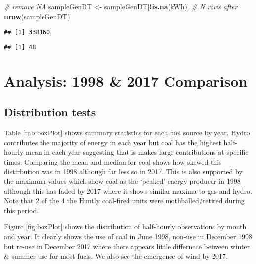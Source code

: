 \documentclass[]{article}
\newenvironment{Shaded}{\begin{snugshade}}{\end{snugshade}}
\newcommand{\KeywordTok}[1]{\textcolor[rgb]{0.13,0.29,0.53}{\textbf{#1}}}
\newcommand{\StringTok}[1]{\textcolor[rgb]{0.31,0.60,0.02}{#1}}
\newcommand{\CommentTok}[1]{\textcolor[rgb]{0.56,0.35,0.01}{\textit{#1}}}
\newcommand{\OperatorTok}[1]{\textcolor[rgb]{0.81,0.36,0.00}{\textbf{#1}}}
\newcommand{\NormalTok}[1]{#1}
\theoremstyle{definition}
\theoremstyle{definition}
\theoremstyle{definition}
\theoremstyle{remark}
\begin{document}
\begin{Shaded}
\begin{Highlighting}[]
\CommentTok{# remove NA}
\NormalTok{sampleGenDT <-}\StringTok{ }\NormalTok{sampleGenDT[}\OperatorTok{!}\KeywordTok{is.na}\NormalTok{(kWh)]}
\CommentTok{# N rows after}
\KeywordTok{nrow}\NormalTok{(sampleGenDT)}
\end{Highlighting}
\end{Shaded}

\begin{verbatim}
## [1] 338160
\end{verbatim}

\begin{Shaded}
\end{Shaded}

\begin{verbatim}
## [1] 48
\end{verbatim}

\section{Analysis: 1998 \& 2017
Comparison}\label{analysis-1998-2017-comparison}

\subsection{Distribution tests}\label{distribution-tests}

Table \ref{tab:boxPlot} shows summary statistics for each fuel source by
year. Hydro contributes the majority of energy in each year but coal has
the highest half-hourly mean in each year suggesting that is makes large
contributions at specific times. Comparing the mean and median for coal
shows how skewed this distirbution was in 1998 although far less so in
2017. This is also supported by the maximum values which show coal as
the `peaked' energy producer in 1998 although this has faded by 2017
where it shows similar maxima to gas and hydro. Note that 2 of the 4 the
Huntly coal-fired units were
\href{https://en.wikipedia.org/wiki/Huntly_Power_Station}{mothballed/retired}
during this period.

Figure \ref{fig:boxPlot} shows the distribution of half-hourly
observations by month and year. It clearly shows the use of coal in June
1998, non-use in December 1998 but re-use in December 2017 where there
appears little differnece between winter \& summer use for most fuels.
We also see the emergence of wind by 2017.
\end{document}
